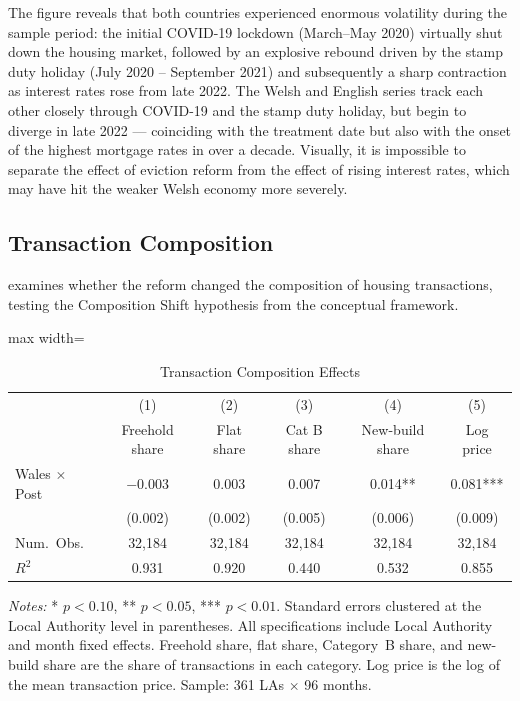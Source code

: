 \documentclass[12pt]{article}
\begin{document}
The figure reveals that both countries experienced enormous volatility during the sample period: the initial COVID-19 lockdown (March--May 2020) virtually shut down the housing market, followed by an explosive rebound driven by the stamp duty holiday (July 2020 -- September 2021) and subsequently a sharp contraction as interest rates rose from late 2022. The Welsh and English series track each other closely through COVID-19 and the stamp duty holiday, but begin to diverge in late 2022 --- coinciding with the treatment date but also with the onset of the highest mortgage rates in over a decade. Visually, it is impossible to separate the effect of eviction reform from the effect of rising interest rates, which may have hit the weaker Welsh economy more severely.

\subsection{Transaction Composition}

 examines whether the reform changed the composition of housing transactions, testing the Composition Shift hypothesis from the conceptual framework.

\begin{table}[H]
\centering
\caption{Transaction Composition Effects}
\label{tab:composition}
\begin{threeparttable}
\begin{adjustbox}{max width=\textwidth}
\begin{tabular}{lccccc}
\toprule
& (1) & (2) & (3) & (4) & (5) \\
& Freehold share & Flat share & Cat B share & New-build share & Log price \\
\midrule
Wales $\times$ Post & $-$0.003 & 0.003 & 0.007 & 0.014** & 0.081*** \\
& (0.002) & (0.002) & (0.005) & (0.006) & (0.009) \\[6pt]
Num.\ Obs. & 32,184 & 32,184 & 32,184 & 32,184 & 32,184 \\
$R^2$ & 0.931 & 0.920 & 0.440 & 0.532 & 0.855 \\
\bottomrule
\end{tabular}
\end{adjustbox}
\begin{tablenotes}[flushleft]
\small
\item \textit{Notes:} * $p<0.10$, ** $p<0.05$, *** $p<0.01$. Standard errors clustered at the Local Authority level in parentheses. All specifications include Local Authority and month fixed effects. Freehold share, flat share, Category~B share, and new-build share are the share of transactions in each category. Log price is the log of the mean transaction price. Sample: 361 LAs $\times$ 96 months.
\end{tablenotes}
\end{threeparttable}
\end{table}
\end{document}
